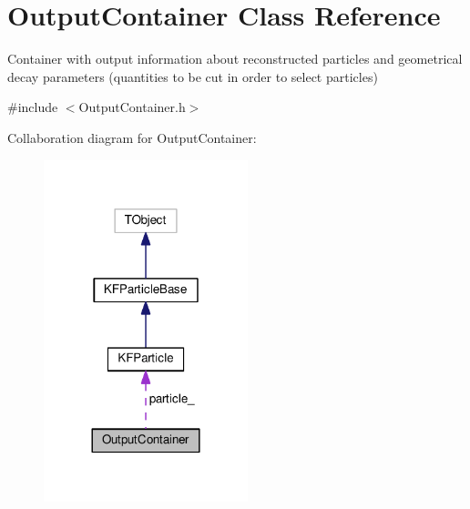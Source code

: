 \hypertarget{classOutputContainer}{}\section{Output\+Container Class Reference}
\label{classOutputContainer}


Container with output information about reconstructed particles and geometrical decay parameters (quantities to be cut in order to select particles)  




{\ttfamily \#include $<$Output\+Container.\+h$>$}



Collaboration diagram for Output\+Container\+:
\nopagebreak
\begin{figure}[H]
\begin{center}
\leavevmode
\includegraphics[width=168pt]{classOutputContainer__coll__graph}
\end{center}
\end{figure}
